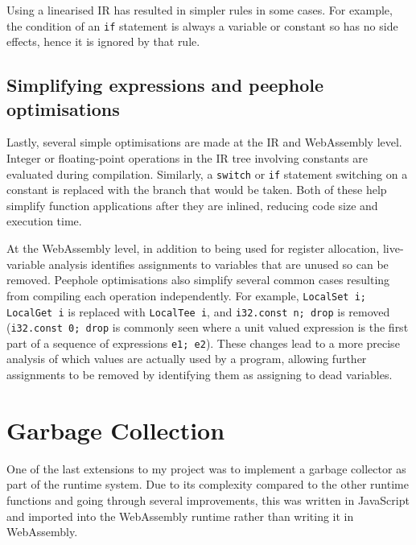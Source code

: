 Using a linearised IR has resulted in simpler rules in some cases. For example, the condition of an \verb|if| statement is always a variable or constant so has no side effects, hence it is ignored by that rule.

%


\subsection{Simplifying expressions and peephole optimisations}
Lastly, several simple optimisations are made at the IR and WebAssembly level. Integer or floating-point operations in the IR tree involving constants are evaluated during compilation. Similarly, a \verb|switch| or \verb|if| statement switching on a constant is replaced with the branch that would be taken. Both of these help simplify function applications after they are inlined, reducing code size and execution time. 

At the WebAssembly level, in addition to being used for register allocation, live-variable analysis identifies assignments to variables that are unused so can be removed. Peephole optimisations also simplify several common cases resulting from compiling each operation independently. For example, \verb|LocalSet i; LocalGet i| is replaced with \verb|LocalTee i|, and \verb|i32.const n; drop| is removed (\verb|i32.const 0; drop| is commonly seen where a unit valued expression is the first part of a sequence of expressions \verb|e1; e2|). These changes lead to a more precise analysis of which values are actually used by a program, allowing further assignments to be removed by identifying them as assigning to dead variables.


\section{Garbage Collection}
One of the last extensions to my project was to implement a garbage collector as part of the runtime system. Due to its complexity compared to the other runtime functions and going through several improvements, this was written in JavaScript and imported into the WebAssembly runtime rather than writing it in WebAssembly. %

